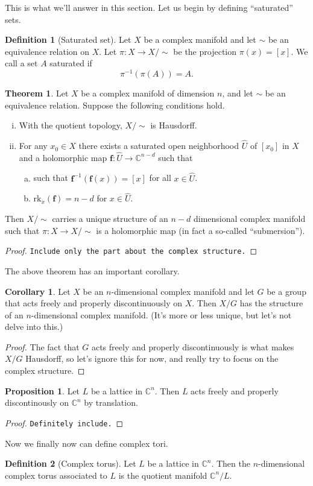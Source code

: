 \documentclass{article}
\theoremstyle{definition}
\newtheorem{defi}{Definition}
\newtheorem{theo}{Theorem}
\newtheorem{coro}{Corollary}
\newtheorem{prop}{Proposition}
\begin{document}
This is what we'll answer in this section. Let us begin by defining ``saturated'' sets.
\begin{defi}[Saturated set]
  Let $X$ be a complex manifold and let $\sim$ be an equivalence relation on $X$. Let $\pi:X\to X/{\sim}$ be the projection $\pi(x)=[x]$. We call a set $A$ saturated if
  \[\pi^{-1}(\pi(A))=A.\]
\end{defi}
\begin{theo}
  Let $X$ be a complex manifold of dimension $n$, and let $\sim$ be an equivalence relation.  Suppose the following conditions hold.
  \begin{enumerate}[(i)]
    \item With the quotient topology, $X/{\sim}$ is Hausdorff.
    \item For any $x_0\in X$ there exists a saturated open neighborhood $\hat{U}$ of $[x_0]$ in $X$ and a holomorphic map $\mathbf{f}:\hat{U}\to\mathbb{C}^{n-d}$ such that
      \begin{enumerate}[(a)]
        \item such that $\mathbf{f}^{-1}(\mathbf{f}(x))=[x]$ for all $x\in\hat{U}$.
        \item $\mathrm{rk}_x(\mathbf{f})=n-d$ for $x\in\hat{U}$.
      \end{enumerate}
  \end{enumerate}
  Then $X/{\sim}$ carries a unique structure of an $n-d$ dimensional complex manifold such that $\pi:X\to X/{\sim}$ is a holomorphic map (in fact a so-called ``submersion'').
\end{theo}
\begin{proof}
  {\tt Include only the part about the complex structure.}
\end{proof}
The above theorem has an important corollary.
\begin{coro}
  Let $X$ be an $n$-dimensional complex manifold and let $G$ be a group that acts freely and properly discontinuously on $X$. Then $X/G$ has the structure of an $n$-dimensional complex manifold. (It's more or less unique, but let's not delve into this.)
\end{coro}
\begin{proof}
  The fact that $G$ acts freely and properly discontinuously is what makes $X/G$ Hausdorff, so let's ignore this for now, and really try to focus on the complex structure.
\end{proof}
\begin{prop}
  Let $L$ be a lattice in $\mathbb{C}^n$. Then $L$ acts freely and properly discontinously on $\mathbb{C}^n$ by translation.
\end{prop}
\begin{proof}
  {\tt Definitely include.}
\end{proof}
Now we finally now can define complex tori.
\begin{defi}[Complex torus]
  Let $L$ be a lattice in $\mathbb{C}^n$. Then the $n$-dimensional complex torus associated to $L$ is the quotient manifold $\mathbb{C}^n/L$.
\end{defi}
\end{document}
